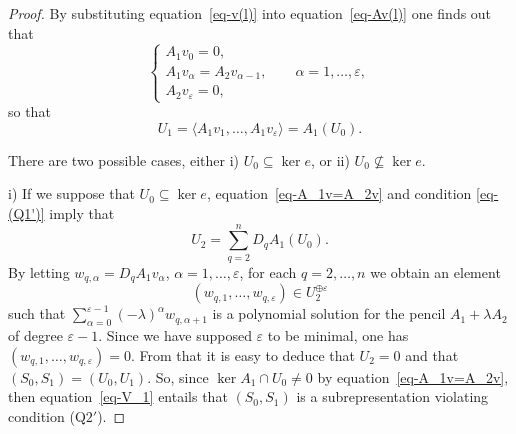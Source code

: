 \documentclass[pdftex]{sigma}
\numberwithin{equation}{section}
\begin{document}
\begin{proof}
By substituting equation~\eqref{eq-v(l)} into equation~\eqref{eq-Av(l)} one finds out that
\begin{equation}
 \begin{cases}
A_{1}v_{0} =0,\\
A_{1}v_{\alpha} =A_{2}v_{\alpha-1},\qquad \alpha=1,\dots,\varepsilon,\\
A_{2}v_{\varepsilon} =0,
\end{cases}
\label{eq-A_1v=A_2v}
\end{equation}
so that
\begin{equation}
U_{1}=\langle A_{1}v_{1},\dots,A_{1}v_{\varepsilon} \rangle=A_{1}(U_{0}) .
\label{eq-V_1}
\end{equation}

There are two possible cases, either i) $U_{0}\subseteq\ker e$, or ii) $U_{0}\not\subseteq\ker e$.

i) If we suppose that
$U_{0}\subseteq\ker e$,
equation~\eqref{eq-A_1v=A_2v} and condition \eqref{eq-(Q1')} imply that
\begin{equation*}
U_{2}=\sum_{q=2}^{n}D_{q}A_{1}(U_{0}) .
\end{equation*}
By letting $w_{q,\alpha}=D_{q}A_{1}v_{\alpha}$, $\alpha=1,\dots,\varepsilon$,
for each $q=2,\dots,n$ we obtain an
 element \[(w_{q,1},\dots,w_{q,\varepsilon})\in U_2^{\oplus\varepsilon} \]
 such that $\sum\limits_{\alpha=0}^{\varepsilon-1}(-\lambda)^{\alpha}w_{q,\alpha+1}$ is a polynomial solution for the pencil $A_{1}+\lambda A_{2}$ of degree $\varepsilon - 1$. Since we have supposed $\varepsilon$ to be minimal, one has
 $(w_{q,1},\dots,w_{q,\varepsilon}) = 0$. From that it is easy to deduce that $U_2 =0$ and that $(S_0, S_1) = (U_0,U_1)$.
 So, since $\ker A_1 \cap U_0 \neq 0$ by equation~\eqref{eq-A_1v=A_2v}, then
 equation~\eqref{eq-V_1} entails that $(S_{0},S_{1})$ is a subrepresentation violating condition (Q$2'$).


\end{proof}
\end{document}
